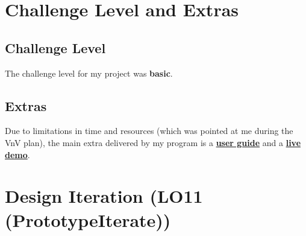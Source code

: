 \documentclass{article}
\begin{document}
\section{Challenge Level and Extras}

\subsection{Challenge Level}

The challenge level for my project was \textbf{basic}.

\subsection{Extras}

Due to limitations in time and resources (which was pointed at me during the VnV plan),
the main extra delivered by my program is a \href{https://github.com/UGarCil/UGarcil_capstone/blob/main/docs/UserGuide/UserGuide.pdf}{\textbf{user guide}}
and a \href{https://replit.com/@garcilau/Sublimat-10#main.py}{\textbf{live demo}}.


\section{Design Iteration (LO11 (PrototypeIterate))}
\end{document}
